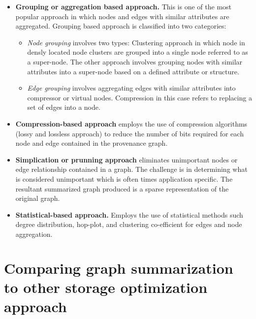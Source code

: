 \begin{itemize}

\item \textbf{Grouping or aggregation based approach.} This is one of the most popular approach in which nodes and edges with similar attributes are aggregated. Grouping based approach is classified into two categories:

\begin{itemize}

\item \textit{Node grouping} involves two types: Clustering approach in which node in densly located node clusters are grouped into a single node referred to as a super-node. The other approach involves grouping nodes with similar attributes into a super-node based on a defined attribute or structure. 

\item \textit{Edge grouping} involves aggregating edges with similar attributes into compressor or virtual nodes. Compression in this case refers to replacing a set of edges into a node. 

\end{itemize}

\item \textbf{Compression-based approach} employs the use of compression algorithms (lossy and lossless approach) to reduce the number of bits required for each node and edge contained in the provenance graph.

\item \textbf{Simplication or prunning approach} eliminates unimportant nodes or edge relationship contained in a graph. The challenge is in determining what is considered unimportant which is often times application specific. The resultant summarized graph produced is a sparse representation of the original graph.

\item \textbf{Statistical-based approach.} Employs the use of statistical methods such degree distribution, hop-plot, and clustering co-efficient for edges and node aggregation.

\end{itemize}

\section{Comparing graph summarization to other storage optimization approach}

